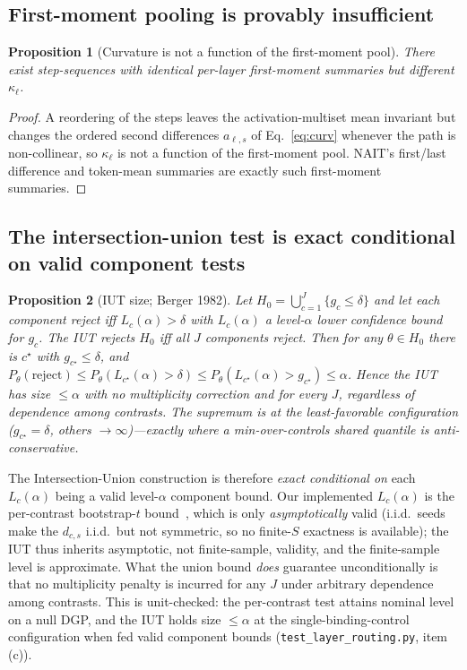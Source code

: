 \documentclass[11pt]{article}
\newtheorem{proposition}{Proposition}
\theoremstyle{definition}
\begin{document}
\subsection{First-moment pooling is provably insufficient}
\begin{proposition}[Curvature is not a function of the first-moment pool]
\label{prop:curv}
There exist step-sequences with identical per-layer first-moment summaries but different
$\kappa_\ell$.
\end{proposition}
\begin{proof}
A reordering of the steps leaves the activation-multiset mean invariant but changes the
ordered second differences $a_{\ell,s}$ of Eq.~\eqref{eq:curv} whenever the path is
non-collinear, so $\kappa_\ell$ is not a function of the first-moment pool. NAIT's
first/last difference and token-mean summaries are exactly such first-moment summaries.
\end{proof}

\subsection{The intersection-union test is exact conditional on valid component tests}
\begin{proposition}[IUT size; Berger 1982]
\label{prop:iut}
Let $H_0=\bigcup_{c=1}^{J}\{g_c\le\delta\}$ and let each component reject iff
$L_c(\alpha)>\delta$ with $L_c(\alpha)$ a level-$\alpha$ lower confidence bound for $g_c$.
The IUT rejects $H_0$ iff all $J$ components reject. Then for any $\theta\in H_0$ there is
$c^\star$ with $g_{c^\star}\le\delta$, and
$P_\theta(\text{reject})\le P_\theta(L_{c^\star}(\alpha)>\delta)\le P_\theta(L_{c^\star}(\alpha)
>g_{c^\star})\le\alpha$. Hence the IUT has size $\le\alpha$ with \emph{no} multiplicity
correction and for every $J$, regardless of dependence among contrasts. The supremum is at
the least-favorable configuration ($g_{c^\star}=\delta$, others $\to\infty$)---exactly where
a min-over-controls shared quantile is anti-conservative.
\end{proposition}
\noindent The Intersection-Union construction is therefore \emph{exact conditional on}
each $L_c(\alpha)$ being a valid level-$\alpha$ component bound. Our implemented
$L_c(\alpha)$ is the per-contrast bootstrap-$t$ bound~\cite{hall1988bootstrap}, which is
only \emph{asymptotically} valid (i.i.d.\ seeds make the $d_{c,s}$ i.i.d.\ but not
symmetric, so no finite-$S$ exactness is available); the IUT thus inherits asymptotic, not
finite-sample, validity, and the finite-sample level is approximate. What the union bound
\emph{does} guarantee unconditionally is that no multiplicity penalty is incurred for any
$J$ under arbitrary dependence among contrasts. This is unit-checked: the per-contrast test
attains nominal level on a null DGP, and the IUT holds size $\le\alpha$ at the
single-binding-control configuration when fed valid component bounds
(\texttt{test\_layer\_routing.py}, item (c)).
\end{document}
